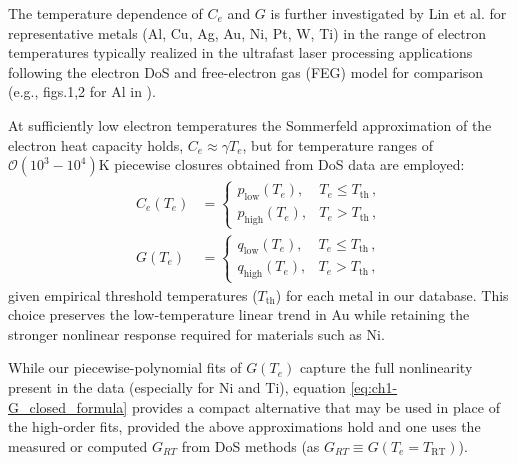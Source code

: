 The temperature dependence of $C_e$ and $G$ is further investigated by Lin et al. \cite{Lin_2008} for representative metals (Al, Cu, Ag, Au, Ni, Pt, W, Ti) in the range of electron
temperatures typically realized in the ultrafast laser processing applications following the electron DoS and free-electron gas (FEG) model for comparison (e.g., figs.1,2 for Al in \cite{Lin_2008}).

At sufficiently low electron temperatures the Sommerfeld approximation of the electron heat capacity holds, \(C_e \approx \gamma T_e\),
but for temperature ranges of $\mathcal{O}(10^3-10^4)$K piecewise closures obtained from DoS data are employed:
\begin{subequations}\label{eq:ch1-ceg-piecewise}
  \begin{align}
    C_e(T_e) & =
    \begin{cases}
      p_{\mathrm{low}}(T_e),  & T_e \leq T_{\mathrm{th}} \, , \\
      p_{\mathrm{high}}(T_e), & T_e > T_{\mathrm{th}} \, ,
    \end{cases} \label{eq:ch1-ce-piecewise} \\
    G(T_e)   & =
    \begin{cases}
      q_{\mathrm{low}}(T_e),  & T_e \leq T_{\mathrm{th}} \, , \\
      q_{\mathrm{high}}(T_e), & T_e > T_{\mathrm{th}} \, ,
    \end{cases} \label{eq:ch1-g-piecewise}
  \end{align}
\end{subequations}
given empirical threshold temperatures ($T_{\mathrm{th}}$) for each metal in our database.
This choice preserves the low-temperature linear trend in Au while retaining the stronger nonlinear response required for materials such as Ni.

While our piecewise-polynomial fits of $G(T_e)$ capture the full nonlinearity present in the data (especially for Ni and Ti),
equation \ref{eq:ch1-G_closed_formula} provides a compact alternative that may be used in place of the high-order fits,
provided the above approximations hold and one uses the measured or computed $G_{RT}$ from DoS methods (as $G_{RT} \equiv G(T_e = T_\text{RT})$).


